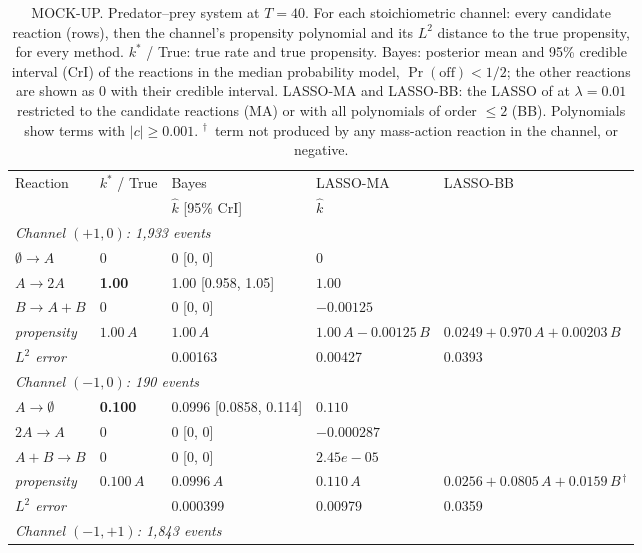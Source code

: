 \begin{table}[htbp]
\centering
\footnotesize
\setlength{\tabcolsep}{3pt}
\caption{MOCK-UP. Predator--prey system at $T=40$. For each stoichiometric channel: every candidate reaction (rows), then the channel's propensity polynomial and its $L^2$ distance to the true propensity, for every method. $k^*$ / True: true rate and true propensity. Bayes: posterior mean and 95\% credible interval (CrI) of the reactions in the median probability model, $\Pr(\text{off})<1/2$; the other reactions are shown as $0$ with their credible interval. LASSO-MA and LASSO-BB: the LASSO of \cite{siam_Zhang2019} at $\lambda=0.01$ restricted to the candidate reactions (MA) or with all polynomials of order $\le 2$ (BB). Polynomials show terms with $|c|\ge 0.001$. $^\dagger$~term not produced by any mass-action reaction in the channel, or negative.}
\begin{tabular}{l l l l l}
\toprule
Reaction & $k^*$ / True & Bayes & LASSO-MA & LASSO-BB \\
 & & $\hat k$ [95\% CrI] & $\hat k$ & \\
\midrule
\multicolumn{5}{l}{\textit{Channel $(+1,0)$: 1{,}933 events}} \\
\quad $\emptyset\to A$ & $0$ & 0 [0, 0] & $0$ &  \\
\quad $A\to 2A$ & \textbf{1.00} & 1.00 [0.958, 1.05] & $1.00$ &  \\
\quad $B\to A+B$ & $0$ & 0 [0, 0] & $-0.00125$ &  \\
\qquad\quad \textit{propensity} & $1.00\,A$ & $1.00\,A$ & $1.00\,A - 0.00125\,B$ & $0.0249 + 0.970\,A + 0.00203\,B$ \\
\qquad\quad \textit{$L^2$ error} & & 0.00163 & 0.00427 & 0.0393 \\
\midrule
\multicolumn{5}{l}{\textit{Channel $(-1,0)$: 190 events}} \\
\quad $A\to \emptyset$ & \textbf{0.100} & 0.0996 [0.0858, 0.114] & $0.110$ &  \\
\quad $2A\to A$ & $0$ & 0 [0, 0] & $-0.000287$ &  \\
\quad $A+B\to B$ & $0$ & 0 [0, 0] & $2.45e-05$ &  \\
\qquad\quad \textit{propensity} & $0.100\,A$ & $0.0996\,A$ & $0.110\,A$ & $0.0256 + 0.0805\,A + 0.0159\,B{}^{\,\dagger}$ \\
\qquad\quad \textit{$L^2$ error} & & 0.000399 & 0.00979 & 0.0359 \\
\midrule
\multicolumn{5}{l}{\textit{Channel $(-1,+1)$: 1{,}843 events}} \\

\end{tabular}
\end{table}

